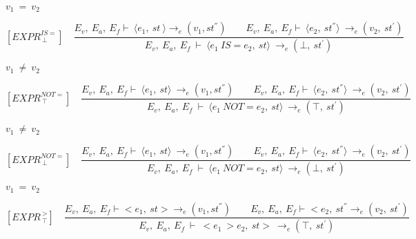 	
	\begin{math}		
		v_1 \ = \ v_2 		
	\end{math}
	
	
	
	
	
	\[
	[EXPR^{IS=}_{\ \bot}] \quad	
	\dfrac{E_v, \ E_a, \ E_f \vdash \ \langle e_1, \ st \ \rangle \rightarrow_e (v_1, st^{''}) \qquad E_v, \ E_a, \ E_f \vdash \ \langle e_2, \ st^{''} \rangle \ \rightarrow_e (v_2, \ st^{'})}{E_v, \ E_a, \ E_f \ \vdash \ \langle e_1 \ IS= e_2, \ st \rangle \ \rightarrow_e (\bot, \ st^{'})}	
	\]
	
	
	\begin{math}		
		v_1 \ \not= \ v_2		
	\end{math}
	
	
	
	
	
	
	
	
	\[	
	[EXPR^{NOT=}_{\ \top}] \quad	
	\dfrac{E_v, \ E_a, \ E_f \vdash \ \langle e_1, \ st \rangle \ \rightarrow_e (v_1, st^{''}) \qquad E_v, \ E_a, \ E_f \vdash \ \langle e_2, \ st^{''} \rangle \ \rightarrow_e (v_2, \ st^{'})}{E_v, \ E_a, \ E_f \ \vdash \ \langle e_1 \ NOT= e_2, \ st \rangle \ \rightarrow_e (\top, \ st^{'})}	
	\]
	
	
	\begin{math}		
		v_1 \ \not= \ v_2		
	\end{math} 
	
	
	
	
	
	
	
	
	\[
	[EXPR^{NOT=}_{\ \bot}] \quad	
	\dfrac{E_v, \ E_a, \ E_f \vdash \ \langle e_1, \ st \rangle \ \rightarrow_e (v_1, st^{''}) \qquad E_v, \ E_a, \ E_f \vdash \ \langle e_2, \ st^{''} \rangle \ \rightarrow_e (v_2, \ st^{'})}{E_v, \ E_a, \ E_f \ \vdash \ \langle e_1 \ NOT= e_2, \ st \rangle \ \rightarrow_e (\bot, \ st^{'})}	
	\]
	
	
	\begin{math}		
		v_1 \ = \ v_2		
	\end{math} 
	
	
	
	
	
	
	
	
	\[	
	[EXPR^{\ >}_{\ \top}] \quad	
	\dfrac{E_v, \ E_a, \ E_f \vdash <e_1, \ st> \rightarrow_e (v_1, st^{''}) \qquad E_v, \ E_a, \ E_f \vdash <e_2, \ st^{''} \rightarrow_e (v_2, \ st^{'})}{E_v, \ E_a, \ E_f \ \vdash \ <e_1 \ > e_2, \ st> \ \rightarrow_e (\top, \ st^{'})}	
	\]
	
